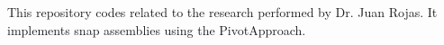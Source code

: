 This repository codes related to the research performed by Dr. Juan Rojas. It implements snap assemblies using the Pivot\-Approach. 